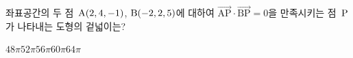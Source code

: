 좌표공간의 두 점~$\mathrm{A}(2{,}\mkern3mu\mathopen{}4{,}\mkern3mu\mathopen{}-1)$, $\mathrm{B}(-2{,}\mkern3mu\mathopen{}2{,}\mkern3mu\mathopen{}5)$에 대하여 $\overrightarrow{\mathrm{AP}}\cdot\overrightarrow{\mathrm{BP}}=0$을 만족시키는 점~$\mathrm{P}$가 나타내는 도형의 겉넓이는?
\begin{choices32}{$48\pi$}{$52\pi$}{$56\pi$}{$60\pi$}{$64\pi$}\end{choices32}
